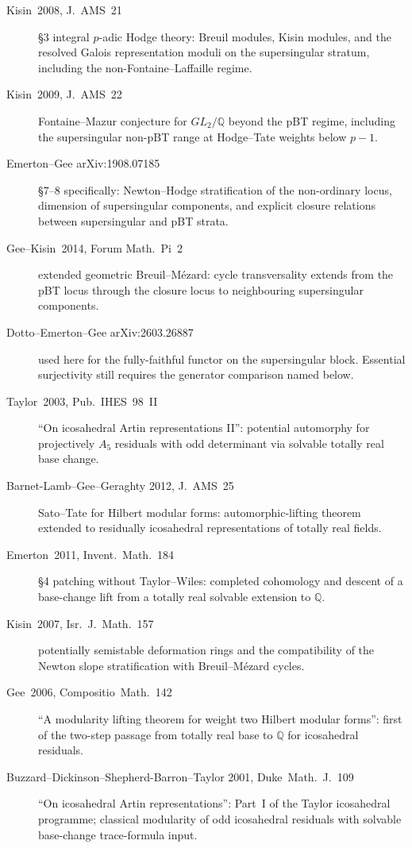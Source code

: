 \begin{description}
\item[Kisin~2008, J.~AMS~21] \S 3 integral \(p\)-adic Hodge theory:
Breuil modules, Kisin modules, and the resolved Galois representation
moduli on the supersingular stratum, including the non-Fontaine--Laffaille
regime.
\item[Kisin~2009, J.~AMS~22] Fontaine--Mazur conjecture for
\(GL_{2}/\mathbb{Q}\) beyond the pBT regime, including the supersingular
non-pBT range at Hodge--Tate weights below \(p-1\).
\item[Emerton--Gee arXiv:1908.07185] \S 7--8 specifically: Newton--Hodge
stratification of the non-ordinary locus, dimension of supersingular
components, and explicit closure relations between supersingular and
pBT strata.
\item[Gee--Kisin~2014, Forum Math.~Pi~2] extended geometric
Breuil--M{\'e}zard: cycle transversality extends from the pBT locus
through the closure locus to neighbouring supersingular components.
\item[Dotto--Emerton--Gee arXiv:2603.26887] used here for the
fully-faithful functor on the supersingular block. Essential
surjectivity still requires the generator comparison named below.
\item[Taylor~2003, Pub.~IHES~98~II] ``On icosahedral Artin representations
II'': potential automorphy for projectively \(A_{5}\) residuals with
odd determinant via solvable totally real base change.
\item[Barnet-Lamb--Gee--Geraghty 2012, J.~AMS~25] Sato--Tate for
Hilbert modular forms: automorphic-lifting theorem extended to
residually icosahedral representations of totally real fields.
\item[Emerton~2011, Invent.~Math.~184] \S 4 patching without
Taylor--Wiles: completed cohomology and descent of a base-change
lift from a totally real solvable extension to \(\mathbb{Q}\).
\item[Kisin~2007, Isr.~J.~Math.~157] potentially semistable
deformation rings and the compatibility of the Newton slope
stratification with Breuil--M{\'e}zard cycles.
\item[Gee~2006, Compositio~Math.~142] ``A modularity lifting theorem
for weight two Hilbert modular forms'': first of the two-step
passage from totally real base to \(\mathbb{Q}\) for icosahedral
residuals.
\item[Buzzard--Dickinson--Shepherd-Barron--Taylor 2001, Duke~Math.~J.~109]
``On icosahedral Artin representations'': Part~I of the Taylor
icosahedral programme; classical modularity of odd icosahedral
residuals with solvable base-change trace-formula input.
\end{description}

